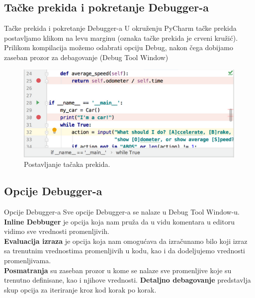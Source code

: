 \documentclass{beamer}
\begin{document}
\subsection{Tačke prekida i pokretanje Debugger-a}
\begin{frame}{Tačke prekida i pokretanje Debugger-a}
U okruženju PyCharm tačke prekida postavljamo klikom na levu marginu (oznaka tačke prekida je crveni kružić).\\
Prilikom kompilacija možemo odabrati opciju Debug, nakon čega dobijamo zaseban prozor za debagovanje (Debug Tool Window)
\begin{figure}[h!]
\begin{center}
\includegraphics[scale = 0.4]{1}
\end{center}
\caption{Postavljanje tačaka prekida.}
\label{1}
\end{figure}
    
\end{frame}
\subsection{Opcije Debugger-a}
\begin{frame}{Opcije Debugger-a}
Sve opcije Debugger-a se nalaze u Debug Tool Window-u.\\
\textbf{Inline Debbuger} je opcija koja nam pruža da u vidu komentara u editoru vidimo sve vrednosti promenljivih.\\
\textbf{Evaluacija izraza} je opcija koja nam omogućava da izračunamo bilo koji izraz sa trenutnim vrednostima promenljivih u kodu, kao i da dodeljujemo vrednosti promenljivama.\\
\textbf{Posmatranja} su zaseban prozor u kome se nalaze sve promenljive koje su trenutno definisane, kao i njihove vrednosti.
\textbf{Detaljno debagovanje} predstavlja skup opcija za iteriranje kroz kod korak po korak.
\end{frame}

\end{document}
